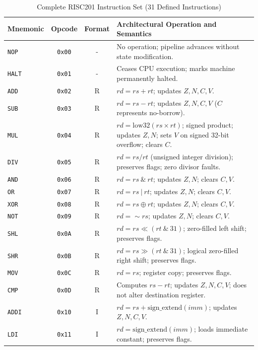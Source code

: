 \documentclass[11pt,a4paper]{article}
\begin{document}
\begin{table}[h]
\centering
\small
\caption{Complete RISC201 Instruction Set (31 Defined Instructions)}
\vspace{0.4em}
\begin{tabularx}{\textwidth}{l c c X}
\toprule
\textbf{Mnemonic} & \textbf{Opcode} & \textbf{Format} & \textbf{Architectural Operation and Semantics} \\
\midrule
\texttt{NOP}  & \texttt{0x00} & - & No operation; pipeline advances without state modification. \\
\texttt{HALT} & \texttt{0x01} & - & Ceases CPU execution; marks machine permanently halted. \\
\texttt{ADD}  & \texttt{0x02} & R & $rd = rs + rt$; updates $Z, N, C, V$. \\
\texttt{SUB}  & \texttt{0x03} & R & $rd = rs - rt$; updates $Z, N, C, V$ ($C$ represents no-borrow). \\
\texttt{MUL}  & \texttt{0x04} & R & $rd = \text{low32}(rs \times rt)$; signed product; updates $Z,N$; sets $V$ on signed 32-bit overflow; clears $C$. \\
\texttt{DIV}  & \texttt{0x05} & R & $rd = rs / rt$ (unsigned integer division); preserves flags; zero divisor faults. \\
\texttt{AND}  & \texttt{0x06} & R & $rd = rs \ \& \ rt$; updates $Z, N$; clears $C, V$. \\
\texttt{OR}   & \texttt{0x07} & R & $rd = rs \ | \ rt$; updates $Z, N$; clears $C, V$. \\
\texttt{XOR}  & \texttt{0x08} & R & $rd = rs \oplus rt$; updates $Z, N$; clears $C, V$. \\
\texttt{NOT}  & \texttt{0x09} & R & $rd = \sim rs$; updates $Z, N$; clears $C, V$. \\
\texttt{SHL}  & \texttt{0x0A} & R & $rd = rs \ll (rt \ \& \ 31)$; zero-filled left shift; preserves flags. \\
\texttt{SHR}  & \texttt{0x0B} & R & $rd = rs \gg (rt \ \& \ 31)$; logical zero-filled right shift; preserves flags. \\
\texttt{MOV}  & \texttt{0x0C} & R & $rd = rs$; register copy; preserves flags. \\
\texttt{CMP}  & \texttt{0x0D} & R & Computes $rs - rt$; updates $Z, N, C, V$; does not alter destination register. \\
\texttt{ADDI} & \texttt{0x10} & I & $rd = rs + \text{sign\_extend}(imm)$; updates $Z, N, C, V$. \\
\texttt{LDI}  & \texttt{0x11} & I & $rd = \text{sign\_extend}(imm)$; loads immediate constant; preserves flags. \\

\end{tabularx}
\end{table}
\end{document}
